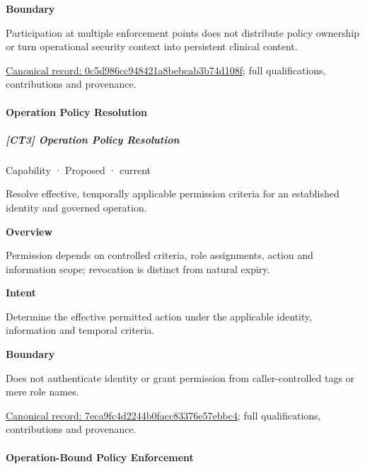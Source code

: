\textbf{Boundary}



Participation at multiple enforcement points does not distribute policy ownership or turn operational security context into persistent clinical content.


{\footnotesize \href{../../../../continuum/strategy/capability/0c5d986cc948421a8bebcab3b74d108f.md}{Canonical record: 0c5d986cc948421a8bebcab3b74d108f}; full qualifications, contributions and provenance.}\par
\paragraph{Operation Policy Resolution}

\subparagraph{[CT3] Operation Policy Resolution}

\label{element:7eca9fc4d2244b0facc83376e57ebbc4}
{\small Capability · Proposed · current}\par

Resolve effective, temporally applicable permission criteria for an established identity and governed operation.



\textbf{Overview}



Permission depends on controlled criteria, role assignments, action and information scope; revocation is distinct from natural expiry.



\textbf{Intent}



Determine the effective permitted action under the applicable identity, information and temporal criteria.



\textbf{Boundary}



Does not authenticate identity or grant permission from caller-controlled tags or mere role names.


{\footnotesize \href{../../../../continuum/strategy/capability/7eca9fc4d2244b0facc83376e57ebbc4.md}{Canonical record: 7eca9fc4d2244b0facc83376e57ebbc4}; full qualifications, contributions and provenance.}\par
\paragraph{Operation-Bound Policy Enforcement}

